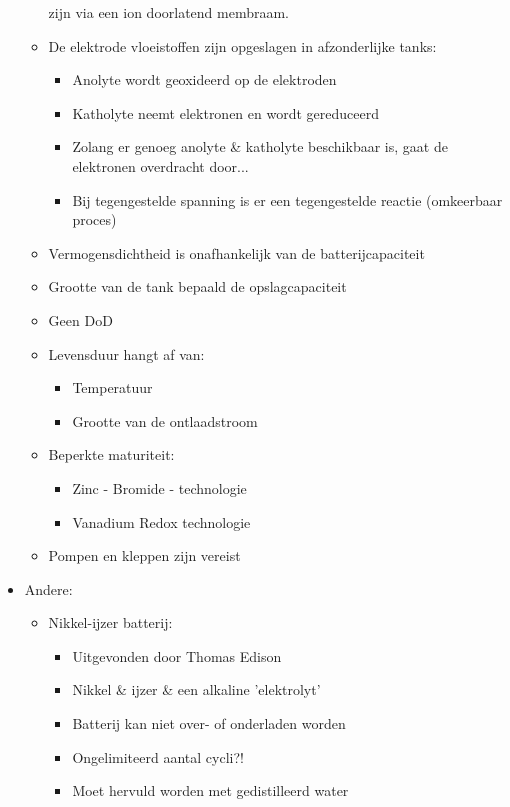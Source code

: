 \documentclass[12pt]{article}
\begin{document}
\begin{itemize}
\begin{itemize}
        zijn via een ion doorlatend membraam.
        \item De elektrode vloeistoffen zijn opgeslagen in afzonderlijke tanks:\begin{itemize}
            \item Anolyte wordt geoxideerd op de elektroden 
            \item Katholyte neemt elektronen en wordt gereduceerd
            \item Zolang er genoeg anolyte \& katholyte beschikbaar is, gaat de elektronen
            overdracht door...
            \item Bij tegengestelde spanning is er een tegengestelde reactie (omkeerbaar
            proces)
        \end{itemize}
        \item Vermogensdichtheid is onafhankelijk van de batterijcapaciteit
        \item Grootte van de tank bepaald de opslagcapaciteit
        \item Geen DoD
        \item Levensduur hangt af van:\begin{itemize}
            \item Temperatuur
            \item Grootte van de ontlaadstroom
        \end{itemize}
        \item Beperkte maturiteit:\begin{itemize}
            \item Zinc - Bromide - technologie 
            \item Vanadium Redox technologie
        \end{itemize}
        \item Pompen en kleppen zijn vereist
    \end{itemize}
    \item Andere:\begin{itemize}
        \item Nikkel-ijzer batterij:\begin{itemize}
            \item Uitgevonden door Thomas Edison 
            \item Nikkel \& ijzer \& een alkaline 'elektrolyt'
            \item Batterij kan niet over- of onderladen worden
            \item Ongelimiteerd aantal cycli?!
            \item Moet hervuld worden met gedistilleerd water

\end{itemize}
\end{itemize}
\end{itemize}
\end{document}
